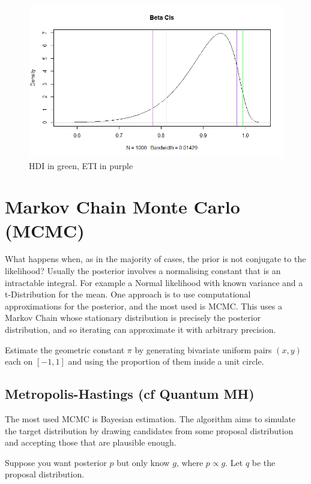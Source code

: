 \documentclass{article}
\begin{document}
\begin{figure}[h]
\centering
\includegraphics[width=1.0\textwidth]{Beta_CIs.png}
\caption{\label{fig:Beta_CIs} HDI in green, ETI in purple}
\end{figure}
\newpage

\section{Markov Chain Monte Carlo (MCMC)}
What happens when, as in the majority of cases, the prior is not conjugate to the likelihood? Usually the posterior involves a normalising constant that is an intractable integral. For example a Normal likelihood with known variance and a t-Distribution for the mean. One approach is to use computational approximations for the posterior, and the most used is MCMC. This uses a Markov Chain whose stationary distribution is precisely the posterior distribution, and so iterating can approximate it with arbitrary precision.

\begin{Exercise}
    Estimate the geometric constant $\pi$ by generating bivariate uniform pairs $(x,y)$ each on $[-1,1]$ and using the proportion of them inside a unit circle.
\end{Exercise}

\subsection{Metropolis-Hastings (cf Quantum MH)}
The most used MCMC is Bayesian estimation. The algorithm aims to simulate the target distribution by drawing candidates from some proposal distribution and accepting those that are plausible enough.

Suppose you want posterior $p$ but only know $g$, where $p \propto g$. Let $q$ be the proposal distribution.
\end{document}
